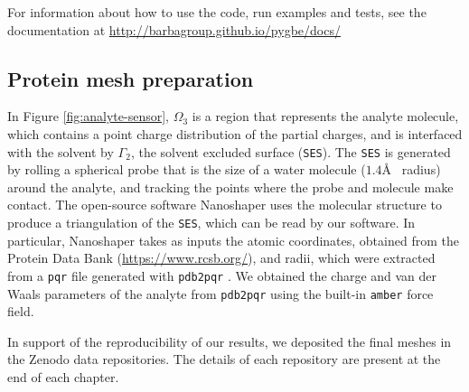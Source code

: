 For information about how to use the code, run examples and tests, see the
\pygbe documentation at \url{http://barbagroup.github.io/pygbe/docs/}

\subsection{Protein mesh preparation}

In Figure \ref{fig:analyte-sensor}, $\Omega_3$ is a region that represents the analyte molecule, which contains a point charge distribution 
of the partial charges, and is interfaced with the solvent by $\Gamma_2$, the solvent excluded surface (\texttt{SES}).
The \texttt{SES} is generated by rolling a spherical probe that is the size of a water molecule ($1.4$\AA~ radius) around the analyte, and tracking 
the points where the probe and molecule make contact.
The open-source software Nanoshaper \cite{Nanoshaper} uses the molecular structure to produce a triangulation of the \texttt{SES}, which can be 
read by our software. In particular, Nanoshaper takes as inputs the atomic coordinates, obtained from the Protein Data Bank (\url{https://www.rcsb.org/}),
and radii, which were extracted from a \texttt{pqr} file generated with \texttt{pdb2pqr} \cite{Dolinsky04}.
We obtained the charge and van der Waals parameters of the analyte from \texttt{pdb2pqr} using the built-in \texttt{amber} force field.

In support of the reproducibility of our results, we deposited the final meshes in the Zenodo data repositories. The details of each repository 
are present at the end of each chapter. 
